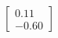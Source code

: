 \documentclass[preview]{standalone}
\begin{document}
\begin{align*}
\begin{bmatrix} 0.11 \\ -0.60 \end{bmatrix}
\end{align*}
\end{document}
